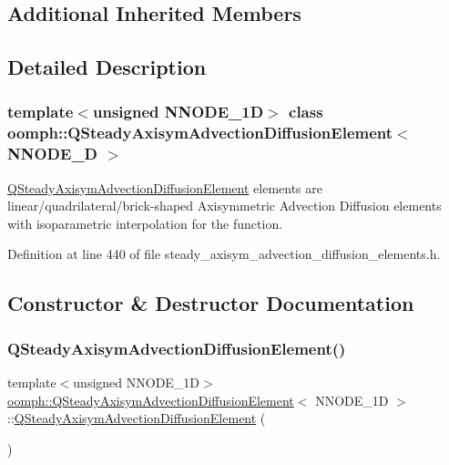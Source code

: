 \subsection*{Additional Inherited Members}


\subsection{Detailed Description}
\subsubsection*{template$<$unsigned N\+N\+O\+D\+E\+\_\+1D$>$\newline
class oomph\+::\+Q\+Steady\+Axisym\+Advection\+Diffusion\+Element$<$ N\+N\+O\+D\+E\+\_\+D $>$}

\hyperlink{classoomph_1_1QSteadyAxisymAdvectionDiffusionElement}{Q\+Steady\+Axisym\+Advection\+Diffusion\+Element} elements are linear/quadrilateral/brick-\/shaped Axisymmetric Advection Diffusion elements with isoparametric interpolation for the function. 

Definition at line 440 of file steady\+\_\+axisym\+\_\+advection\+\_\+diffusion\+\_\+elements.\+h.



\subsection{Constructor \& Destructor Documentation}
\mbox{\label{classoomph_1_1QSteadyAxisymAdvectionDiffusionElement_ae6bf7086187387165208d76d8e4dedf1}} 
\subsubsection{\texorpdfstring{Q\+Steady\+Axisym\+Advection\+Diffusion\+Element()}{QSteadyAxisymAdvectionDiffusionElement()}\hspace{0.1cm}{\footnotesize\ttfamily [1/2]}}
{\footnotesize\ttfamily template$<$unsigned N\+N\+O\+D\+E\+\_\+1D$>$ \\
\hyperlink{classoomph_1_1QSteadyAxisymAdvectionDiffusionElement}{oomph\+::\+Q\+Steady\+Axisym\+Advection\+Diffusion\+Element}$<$ N\+N\+O\+D\+E\+\_\+1D $>$\+::\hyperlink{classoomph_1_1QSteadyAxisymAdvectionDiffusionElement}{Q\+Steady\+Axisym\+Advection\+Diffusion\+Element} (\begin{DoxyParamCaption}{ }\end{DoxyParamCaption})\hspace{0.3cm}{\ttfamily [inline]}}



